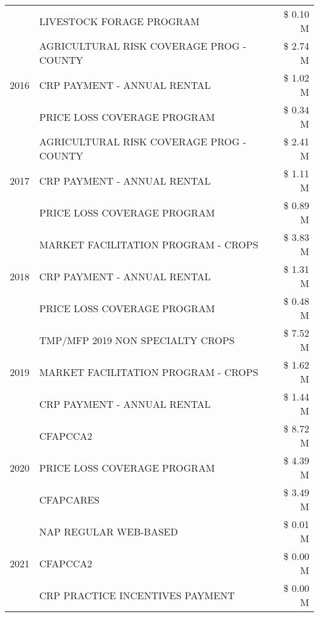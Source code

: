 \begin{tabular}{llr}
 & LIVESTOCK FORAGE PROGRAM & \$ 0.10 M \\
\cline{1-3}
\multirow[t]{3}{*}{2016} & AGRICULTURAL RISK COVERAGE PROG - COUNTY & \$ 2.74 M \\
 & CRP PAYMENT - ANNUAL RENTAL & \$ 1.02 M \\
 & PRICE LOSS COVERAGE PROGRAM & \$ 0.34 M \\
\cline{1-3}
\multirow[t]{3}{*}{2017} & AGRICULTURAL RISK COVERAGE PROG - COUNTY & \$ 2.41 M \\
 & CRP PAYMENT - ANNUAL RENTAL & \$ 1.11 M \\
 & PRICE LOSS COVERAGE PROGRAM & \$ 0.89 M \\
\cline{1-3}
\multirow[t]{3}{*}{2018} & MARKET FACILITATION PROGRAM - CROPS & \$ 3.83 M \\
 & CRP PAYMENT - ANNUAL RENTAL & \$ 1.31 M \\
 & PRICE LOSS COVERAGE PROGRAM & \$ 0.48 M \\
\cline{1-3}
\multirow[t]{3}{*}{2019} & TMP/MFP 2019 NON SPECIALTY CROPS & \$ 7.52 M \\
 & MARKET FACILITATION PROGRAM - CROPS & \$ 1.62 M \\
 & CRP PAYMENT - ANNUAL RENTAL & \$ 1.44 M \\
\cline{1-3}
\multirow[t]{3}{*}{2020} & CFAPCCA2 & \$ 8.72 M \\
 & PRICE LOSS COVERAGE PROGRAM & \$ 4.39 M \\
 & CFAPCARES & \$ 3.49 M \\
\cline{1-3}
\multirow[t]{3}{*}{2021} & NAP REGULAR WEB-BASED & \$ 0.01 M \\
 & CFAPCCA2 & \$ 0.00 M \\
 & CRP PRACTICE INCENTIVES PAYMENT & \$ 0.00 M \\
\cline{1-3}
\bottomrule
\end{tabular}
